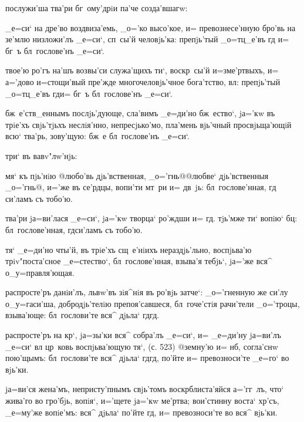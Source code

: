   послужи'ша тва'ри бг~ому'дрiи 
па'че созда'вшагw:

 _е=си` на дре'во воздвиза'емь, _о='ко 
высо'кое, и= превознесе'нную бро'вь на зе'млю низложи'лъ 
_е=си`, сп~сы'й человjь'ка: препjь'тый _о=тц_е'въ гд 
и= бг~ъ бл~гослове'нъ _е=си`.

 твое'ю ро'гъ на'шъ возвы'си служа'щихъ ти`, 
воскр~сы'й и=з\ъ ме'ртвыхъ, и= а='дово и=стощи'вый 
пре'жде многочеловjь'чное бога'тство, вл: препjь'тый 
_о=тц_е'въ гд и= бг~ъ бл~гослове'нъ _е=си`.

  бж~е'ств_еннымъ 
послjь'дующе, сла'вимъ _е=ди'но бж~ество`, jа='кw въ 
трiе'хъ свjь'тjьхъ неслiя'нно, непресjько'мо, пла'мень 
вjь'чный просвjьща'ющiй всю` тва'рь, зову'щую: бж~е 
бл~гослове'нъ _е=си`.

   три` въ вавv"лw'нjь:

 мя` къ пjь'нiю @любо'вь дjь'вственная, 
_о='гнь@{@любве` дjь'вственныя _о='гнь@}, и='же въ 
се'рдцы, вопи'ти мт~ри и= дв~jь: бл~гослове'нная, гд 
си'ламъ съ тобо'ю.

 тва'ри jа=ви'лася _е=си`, jа='кw творца` 
ро'ждши и= гд. тjь'мже ти` вопiю` бц: 
бл~гослове'нная, гд си'ламъ съ тобо'ю.

  тя` _е=ди'но чты'й, въ трiе'хъ 
сщ~е'нiихъ нераздjь'льно, воспjьва'ю трiv"поста'сное 
_е=стество`, бл~гослове'нная, взыва'я тебjь`, jа='же вся^ 
о_у=правля'ющая.


 распросте'ръ данiи'лъ, львw'въ 
зiя^нiя въ ро'вjь затче`: _о='гненную же си'лу 
о_у=гаси'ша, добродjь'телiю препоя'савшеся, бл~гоче'стiя 
рачи'тели _о='троцы, взыва'юще: бл~гослови'те вся^ дjьла` 
гд гд.

 распросте'ръ на кр`, jа=зы'ки вся^ 
собра'лъ _е=си`, и= _е=ди'ну jа=ви'лъ _е=си` вл 
цр~ковь воспjьва'ющую тя`, (с. 523) @земну'ю и= 
нб, согла'снw пою'щымъ: 
бл~гослови'те вся^ дjьла` гд гд, по'йте и= 
превозноси'те _е=го` во вjь'ки.

 jа=ви'ся жена'мъ, непристу'пнымъ 
свjь'томъ воскр блиста'яйся а='гг~лъ, что` жива'го 
во гро'бjь, вопiя`, и='щете jа='кw ме'ртва; вои'стинну 
воста` хр'съ, _е=му'же вопiе'мъ: вся^ дjьла` по'йте 
гд, и= превозноси'те во вся^ вjь'ки.

